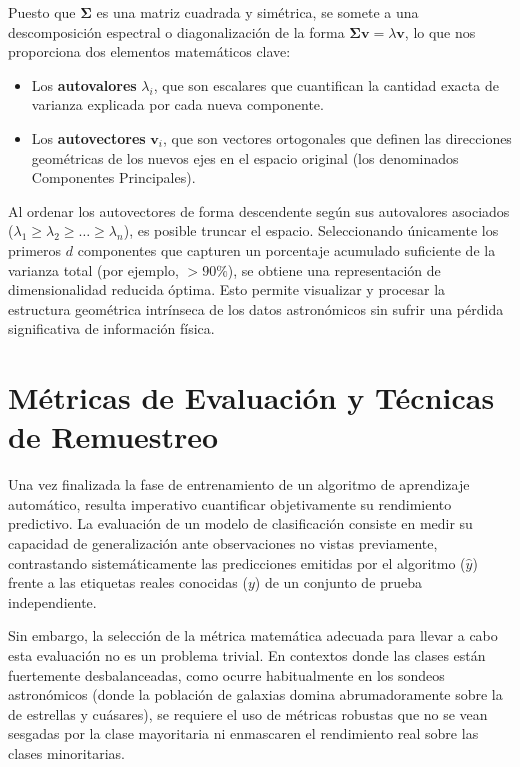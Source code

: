 \documentclass[12pt, a4paper]{report}
\begin{document}
Puesto que $\mathbf{\Sigma}$ es una matriz cuadrada y simétrica, se somete a una descomposición espectral o diagonalización de la forma $\mathbf{\Sigma} \mathbf{v} = \lambda \mathbf{v}$, lo que nos proporciona dos elementos matemáticos clave:
\begin{itemize}
    \item Los \textbf{autovalores} $\lambda_i$, que son escalares que cuantifican la cantidad exacta de varianza explicada por cada nueva componente.
    \item Los \textbf{autovectores} $\mathbf{v}_i$, que son vectores ortogonales que definen las direcciones geométricas de los nuevos ejes en el espacio original (los denominados Componentes Principales).
\end{itemize}

Al ordenar los autovectores de forma descendente según sus autovalores asociados ($\lambda_1 \geq \lambda_2 \geq \dots \geq \lambda_n$), es posible truncar el espacio. Seleccionando únicamente los primeros $d$ componentes que capturen un porcentaje acumulado suficiente de la varianza total (por ejemplo, $>90\%$), se obtiene una representación de dimensionalidad reducida óptima. Esto permite visualizar y procesar la estructura geométrica intrínseca de los datos astronómicos sin sufrir una pérdida significativa de información física.

\section{Métricas de Evaluación y Técnicas de Remuestreo}

Una vez finalizada la fase de entrenamiento de un algoritmo de aprendizaje automático, resulta imperativo cuantificar objetivamente su rendimiento predictivo. La evaluación de un modelo de clasificación consiste en medir su capacidad de generalización ante observaciones no vistas previamente, contrastando sistemáticamente las predicciones emitidas por el algoritmo ($\hat{y}$) frente a las etiquetas reales conocidas ($y$) de un conjunto de prueba independiente.

Sin embargo, la selección de la métrica matemática adecuada para llevar a cabo esta evaluación no es un problema trivial. En contextos donde las clases están fuertemente desbalanceadas, como ocurre habitualmente en los sondeos astronómicos (donde la población de galaxias domina abrumadoramente sobre la de estrellas y cuásares), se requiere el uso de métricas robustas que no se vean sesgadas por la clase mayoritaria ni enmascaren el rendimiento real sobre las clases minoritarias.
\end{document}
